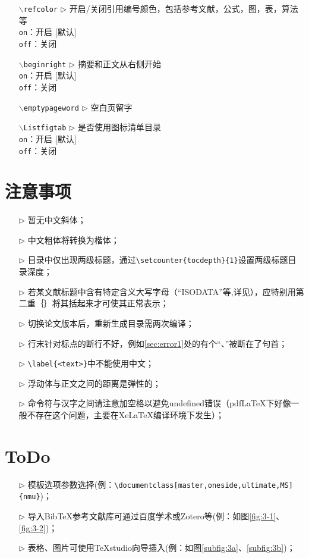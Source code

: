 \begin{itemize}[leftmargin=3cm]
	\item[{\tt  $\backslash$refcolor} $\triangleright$]  开启/关闭引用编号颜色，包括参考文献，公式，图，表，算法等\\
	\texttt{on}：开启 [默认]\\
	\texttt{off}：关闭
	\item[{\tt $\backslash$beginright} $\triangleright$]  摘要和正文从右侧开始\\
	\texttt{on}：开启 [默认]\\
	\texttt{off}：关闭
	\item[{\tt $\backslash$emptypageword} $\triangleright$]  空白页留字
	\item[{\tt $\backslash$Listfigtab} $\triangleright$]  是否使用图标清单目录\\
	\texttt{on}：开启 [默认]\\
	\texttt{off}：关闭
\end{itemize}


\section{注意事项}
\begin{itemize}
  \item[$\triangleright$] 暂无中文斜体；
  \item[$\triangleright$] 中文粗体将转换为楷体；
  \item[$\triangleright$] 目录中仅出现两级标题，通过\verb|\setcounter{tocdepth}{1}|设置两级标题目录深度；
  \item[$\triangleright$] 若某文献标题中含有特定含义大写字母（“ISODATA”等,详见\cite{Li2017An}），应特别用第二重｛｝将其括起来才可使其正常表示；
  \item[$\triangleright$] 切换论文版本后，重新生成目录需两次编译；
  \item[$\triangleright$] 行末针对标点的断行不好，例如\ref{sec:error1}处的有个“、”被断在了句首；
  \item[$\triangleright$] \verb|\label{<text>}|中不能使用中文；
  \item[$\triangleright$] 浮动体与正文之间的距离是弹性的；
  \item[$\triangleright$] 命令符与汉字之间请注意加空格以避免undefined错误（pdfLaTeX下好像一般不存在这个问题，主要在XeLaTeX编译环境下发生）；
\end{itemize}

\section{ToDo}
\begin{itemize}
  \item[$\triangleright$] 模板选项参数选择(例：\verb|\documentclass[master,oneside,ultimate,MS]{nmu}|)；
  \item[$\triangleright$] 导入BibTeX参考文献库可通过百度学术或Zotero等(例：如图\ref{fig:3-1}、\ref{fig:3-2})；
  \item[$\triangleright$] 表格、图片可使用TeXstudio向导插入(例：如图\ref{subfig:3a}、\ref{subfig:3b})；
\end{itemize}

